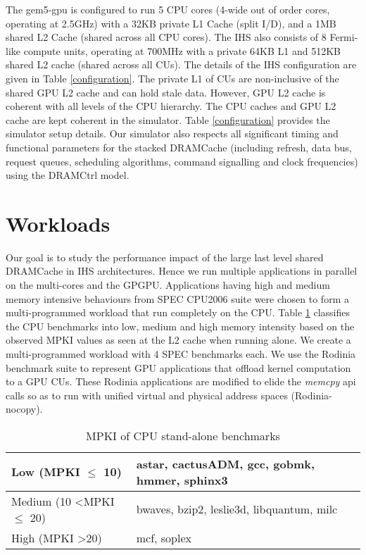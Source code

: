 The gem5-gpu is configured to run 5 CPU cores (4-wide out of order cores, operating at 2.5GHz) with a 32KB private L1 Cache (split I/D), and a 1MB shared L2 Cache (shared across all CPU cores). The IHS also consists of 8 Fermi-like compute units, operating at 700MHz with a private 64KB L1 and 512KB shared L2 cache (shared across all CUs). The details of the IHS configuration are given in Table \ref{configuration}. The private L1 of CUs are non-inclusive of the shared GPU L2 cache and can hold stale data. However, GPU L2 cache is coherent with all levels of the CPU hierarchy. The CPU caches and GPU L2 cache are kept coherent in the simulator. Table \ref{configuration} provides the simulator setup details. 
Our simulator also respects all significant timing and functional parameters for the stacked DRAMCache (including refresh, data bus, request queues, scheduling algorithms, command signalling and clock frequencies) using the DRAMCtrl \cite{dramctrl} model.

\section{Workloads} 
Our goal is to study the performance impact of the large last level shared DRAMCache in IHS architectures. Hence we run multiple applications in parallel on the multi-cores and the GPGPU. Applications having high and medium memory intensive behaviours from SPEC CPU2006 suite \cite{spec2006} were chosen to form a multi-programmed workload that run completely on the CPU. Table \ref{single-cpu-mpki} classifies the CPU benchmarks into low, medium and high memory intensity based on the observed MPKI values as seen at the L2 cache when running alone. We create a multi-programmed workload with 4 SPEC benchmarks each. We use the Rodinia benchmark suite \cite{rodinia} to represent GPU applications that offload kernel computation to a GPU CUs. These Rodinia applications are modified to elide the \textit{memcpy} api calls so as to run with unified virtual and physical address spaces (Rodinia-nocopy). 

\begin{table}[htb]
	\centering
	\begin{tabular}{|l|l|}
		\hline
		Low (MPKI $\leq$ 10)          \hspace{5em}      & astar, cactusADM, gcc, gobmk, hmmer, sphinx3    \\ \hline
		Medium (10 \textless MPKI $\leq$ 20) & bwaves, bzip2, leslie3d, libquantum, milc \\ \hline
		High (MPKI \textgreater 20)            & mcf, soplex       \\ \hline
	\end{tabular}
	\caption{MPKI of CPU stand-alone benchmarks}
	\label{single-cpu-mpki}
\end{table}

